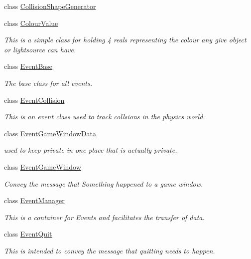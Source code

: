 \begin{DoxyCompactItemize}
class \hyperlink{classphys_1_1CollisionShapeGenerator}{CollisionShapeGenerator}
\item 
class \hyperlink{classphys_1_1ColourValue}{ColourValue}
\begin{DoxyCompactList}\small\item\em This is a simple class for holding 4 reals representing the colour any give object or lightsource can have. \item\end{DoxyCompactList}\item 
class \hyperlink{classphys_1_1EventBase}{EventBase}
\begin{DoxyCompactList}\small\item\em The base class for all events. \item\end{DoxyCompactList}\item 
class \hyperlink{classphys_1_1EventCollision}{EventCollision}
\begin{DoxyCompactList}\small\item\em This is an event class used to track collsions in the physics world. \item\end{DoxyCompactList}\item 
class \hyperlink{classphys_1_1EventGameWindowData}{EventGameWindowData}
\begin{DoxyCompactList}\small\item\em used to keep private in one place that is actually private. \item\end{DoxyCompactList}\item 
class \hyperlink{classphys_1_1EventGameWindow}{EventGameWindow}
\begin{DoxyCompactList}\small\item\em Convey the message that Something happened to a game window. \item\end{DoxyCompactList}\item 
class \hyperlink{classphys_1_1EventManager}{EventManager}
\begin{DoxyCompactList}\small\item\em This is a container for Events and facilitates the transfer of data. \item\end{DoxyCompactList}\item 
class \hyperlink{classphys_1_1EventQuit}{EventQuit}
\begin{DoxyCompactList}\small\item\em This is intended to convey the message that quitting needs to happen. \item\end{DoxyCompactList}\item 

\end{DoxyCompactItemize}
